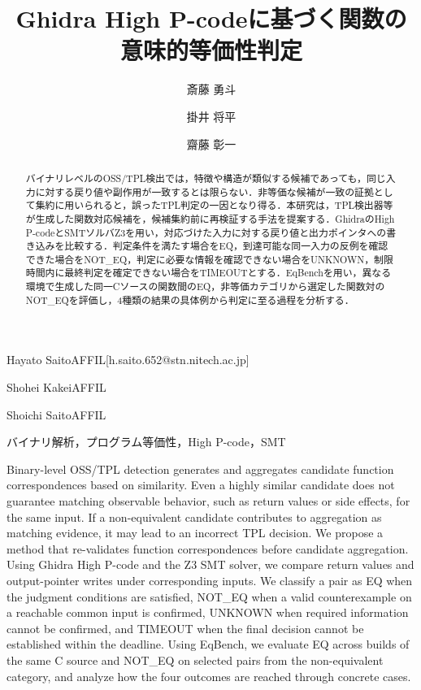 \documentclass{css}
\begin{document}
\title{Ghidra High P-codeに基づく関数の意味的等価性判定}


\author{斎藤 勇斗}{Hayato Saito}{AFFIL}[h.saito.652@stn.nitech.ac.jp]
\author{掛井 将平}{Shohei Kakei}{AFFIL}
\author{齋藤 彰一}{Shoichi Saito}{AFFIL}

\begin{abstract}
バイナリレベルのOSS/TPL検出では，特徴や構造が類似する候補であっても，同じ入力に対する戻り値や副作用が一致するとは限らない．非等価な候補が一致の証拠として集約に用いられると，誤ったTPL判定の一因となり得る．本研究は，TPL検出器等が生成した関数対応候補を，候補集約前に再検証する手法を提案する．GhidraのHigh P-codeとSMTソルバZ3を用い，対応づけた入力に対する戻り値と出力ポインタへの書き込みを比較する．判定条件を満たす場合をEQ，到達可能な同一入力の反例を確認できた場合をNOT\_EQ，判定に必要な情報を確認できない場合をUNKNOWN，制限時間内に最終判定を確定できない場合をTIMEOUTとする．EqBenchを用い，異なる環境で生成した同一Cソースの関数間のEQ，非等価カテゴリから選定した関数対のNOT\_EQを評価し，4種類の結果の具体例から判定に至る過程を分析する．
\end{abstract}

\begin{jkeyword}
バイナリ解析，プログラム等価性，High P-code，SMT
\end{jkeyword}

\begin{eabstract}
Binary-level OSS/TPL detection generates and aggregates candidate function correspondences based on similarity. Even a highly similar candidate does not guarantee matching observable behavior, such as return values or side effects, for the same input. If a non-equivalent candidate contributes to aggregation as matching evidence, it may lead to an incorrect TPL decision. We propose a method that re-validates function correspondences before candidate aggregation. Using Ghidra High P-code and the Z3 SMT solver, we compare return values and output-pointer writes under corresponding inputs. We classify a pair as EQ when the judgment conditions are satisfied, NOT\_EQ when a valid counterexample on a reachable common input is confirmed, UNKNOWN when required information cannot be confirmed, and TIMEOUT when the final decision cannot be established within the deadline. Using EqBench, we evaluate EQ across builds of the same C source and NOT\_EQ on selected pairs from the non-equivalent category, and analyze how the four outcomes are reached through concrete cases.
\end{eabstract}
\end{document}
